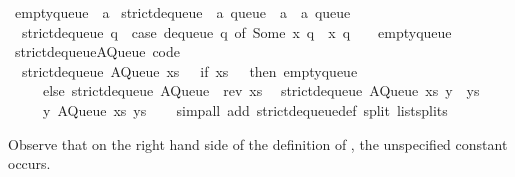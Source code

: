 \begin{isabellebody}
%
\endisadelimquote
%
\isatagquote
{}\isamarkupfalse%
\ empty{\isacharunderscore}queue\ {\isacharcolon}{\isacharcolon}\ {\isacharprime}a\isanewline
\isanewline
{}\isamarkupfalse%
\ strict{\isacharunderscore}dequeue{\isacharprime}\ {\isacharcolon}{\isacharcolon}\ {\isachardoublequoteopen}{\isacharprime}a\ queue\ {\isasymRightarrow}\ {\isacharprime}a\ {\isasymtimes}\ {\isacharprime}a\ queue{\isachardoublequoteclose}\ \isanewline
\ \ {\isachardoublequoteopen}strict{\isacharunderscore}dequeue{\isacharprime}\ q\ {\isacharequal}\ {\isacharparenleft}case\ dequeue\ q\ of\ {\isacharparenleft}Some\ x{\isacharcomma}\ q{\isacharprime}{\isacharparenright}\ {\isasymRightarrow}\ {\isacharparenleft}x{\isacharcomma}\ q{\isacharprime}{\isacharparenright}\ {\isacharbar}\ {\isacharunderscore}\ {\isasymRightarrow}\ empty{\isacharunderscore}queue{\isacharparenright}{\isachardoublequoteclose}\isanewline
\isanewline
{}\isamarkupfalse%
\ strict{\isacharunderscore}dequeue{\isacharprime}{\isacharunderscore}AQueue\ {\isacharbrackleft}code{\isacharbrackright}{\isacharcolon}\isanewline
\ \ {\isachardoublequoteopen}strict{\isacharunderscore}dequeue{\isacharprime}\ {\isacharparenleft}AQueue\ xs\ {\isacharbrackleft}{\isacharbrackright}{\isacharparenright}\ {\isacharequal}\ {\isacharparenleft}if\ xs\ {\isacharequal}\ {\isacharbrackleft}{\isacharbrackright}\ then\ empty{\isacharunderscore}queue\isanewline
\ \ \ \ \ else\ strict{\isacharunderscore}dequeue{\isacharprime}\ {\isacharparenleft}AQueue\ {\isacharbrackleft}{\isacharbrackright}\ {\isacharparenleft}rev\ xs{\isacharparenright}{\isacharparenright}{\isacharparenright}{\isachardoublequoteclose}\isanewline
\ \ {\isachardoublequoteopen}strict{\isacharunderscore}dequeue{\isacharprime}\ {\isacharparenleft}AQueue\ xs\ {\isacharparenleft}y\ {\isacharhash}\ ys{\isacharparenright}{\isacharparenright}\ {\isacharequal}\isanewline
\ \ \ \ \ {\isacharparenleft}y{\isacharcomma}\ AQueue\ xs\ ys{\isacharparenright}{\isachardoublequoteclose}\isanewline
\ \ \isamarkupfalse%
\ {\isacharparenleft}simp{\isacharunderscore}all\ add{\isacharcolon}\ strict{\isacharunderscore}dequeue{\isacharprime}{\isacharunderscore}def\ split{\isacharcolon}\ list{\isachardot}splits{\isacharparenright}%
\endisatagquote
{\isafoldquote}%
%
\isadelimquote
%
\endisadelimquote
%
\begin{isamarkuptext}%
Observe that on the right hand side of the definition of , the unspecified constant  occurs.


\end{isamarkuptext}
\end{isabellebody}
